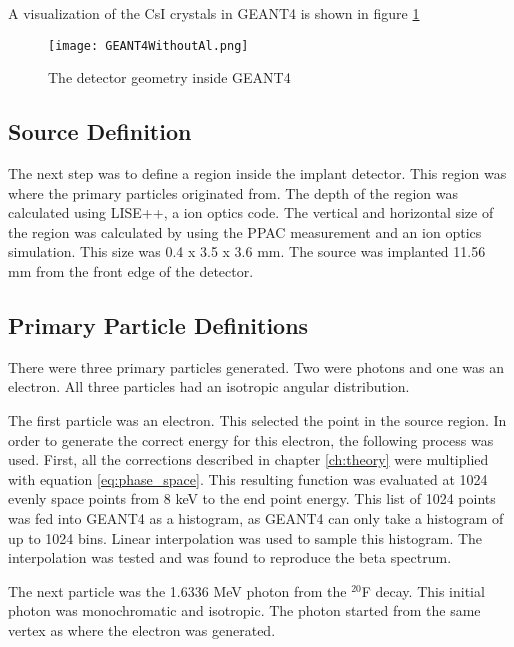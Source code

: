 \documentclass[../MaxHughesThesis.tex]{subfiles}
\begin{document}
A visualization of the CsI crystals in GEANT4 is shown in figure \ref{fig:GEANT4Det}

\begin{figure}[!htb]
	\centerline{\texttt{[image: GEANT4WithoutAl.png]}}
	\caption{The detector geometry inside GEANT4}
	\label{fig:GEANT4Det}
\end{figure}

\subsection{Source Definition}
The next step was to define a region inside the implant detector.
This region was where the primary particles originated from.
The depth of the region was calculated using LISE++, a ion optics code.
The vertical and horizontal size of the region was calculated by using the PPAC measurement and an ion optics simulation.
This size was 0.4 x 3.5 x 3.6 mm.
The source was implanted 11.56 mm from the front edge of the detector.

\subsection{Primary Particle Definitions}
There were three primary particles generated.
Two were photons and one was an electron.
All three particles had an isotropic angular distribution.

The first particle was an electron. 
This selected the point in the source region.
In order to generate the correct energy for this electron, the following process was used.
First, all the corrections described in chapter \ref{ch:theory} were multiplied with equation \ref{eq:phase_space}.
This resulting function was evaluated at 1024 evenly space points from 8 keV to the end point energy.
This list of 1024 points was fed into GEANT4 as a histogram, as GEANT4 can only take a histogram of up to 1024 bins. 
Linear interpolation was used to sample this histogram.
The interpolation was tested and was found to reproduce the beta spectrum.

The next particle was the 1.6336 MeV photon from the $^{20}$F decay.
This initial photon was monochromatic and isotropic.
The photon started from the same vertex as where the electron was generated.
\end{document}
